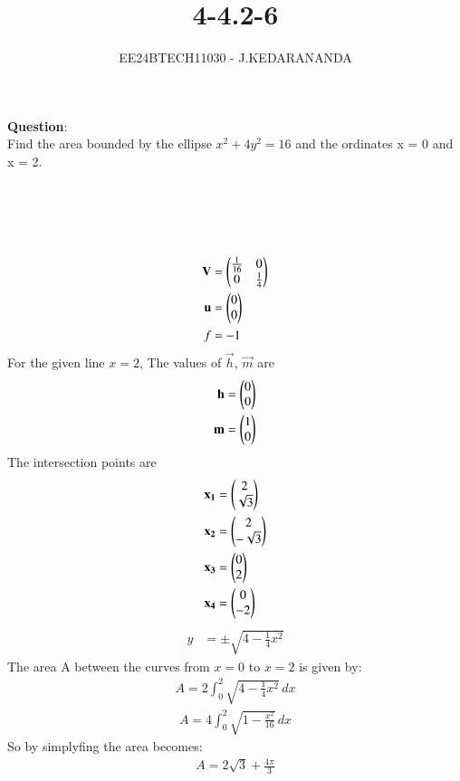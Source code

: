 \documentclass[journal]{IEEEtran}
\numberwithin{equation}{enumi}
\numberwithin{figure}{enumi}
\begin{document}

\title{4-4.2-6}
\author{EE24BTECH11030 - J.KEDARANANDA}
{\let\newpage\relax\maketitle}
\textbf{Question}:\\
Find the area bounded by the ellipse $x^2 + 4y^2 = 16$ and the ordinates x = 0 and x = 2.
\\
\solution \\
\begin{table}[h!]    
  \centering
  
  \caption{}
\end{table}\\
\begin{table}[h!]    
  \centering
  
  \caption{}
\end{table}\\
\begin{align}
\mathbf{V}&=\begin{pmatrix}\frac{1}{16} & 0\\0 & \frac{1}{4}\end{pmatrix}\\
\mathbf{u}&=\begin{pmatrix}0\\0\end{pmatrix}\\
f&=-1
\end{align}
For the given line $x=2$, The values of $\vec{h}$, $\vec{m}$ are
\begin{align}
\mathbf{h}&=\begin{pmatrix}0\\0\end{pmatrix}\\
\mathbf{m}&=\begin{pmatrix}1\\0\end{pmatrix}
\end{align}
The intersection points are
\begin{align}
\mathbf{x_1} &= \begin{pmatrix}2\\\sqrt{3}\end{pmatrix}\\
\mathbf{x_2} &= \begin{pmatrix}2\\-\sqrt{3}\end{pmatrix}\\
\mathbf{x_3} &= \begin{pmatrix}0\\2\end{pmatrix}\\
\mathbf{x_4} &= \begin{pmatrix}0\\-2\end{pmatrix}\\
\end{align}
\begin{align}
y &= \pm \sqrt{4 - \frac{1}{4}x^2}
\end{align}
The area A  between the curves from \( x = 0 \) to \( x = 2 \) is given by:
\begin{align}
A= 2 \int_0^2 \sqrt{4 - \frac{1}{4}x^2} \, dx
\end{align}
\begin{align}
A = 4 \int_0^2 \sqrt{1 - \frac{x^2}{16}} \, dx
\end{align}
So by simplyfing the area becomes:
\begin{align}
A = 2\sqrt{3} + \frac{4\pi}{3}
\end{align}
\end{document}
